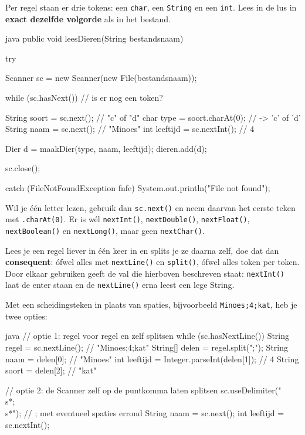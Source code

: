 \documentclass[a4paper,11pt]{article}
\begin{document}
Per regel staan er drie tokens: een \texttt{char}, een \texttt{String} en een
\texttt{int}. Lees in de lus in \textbf{exact dezelfde volgorde} als in het
bestand.

\begin{codeblock}{java}
    public void leesDieren(String bestandsnaam)
    {
    try {
    Scanner sc = new Scanner(new File(bestandsnaam));

    while (sc.hasNext())    // is er nog een token?
    {
    String soort = sc.next();        // "c"  of "d"
    char type = soort.charAt(0);     // -> 'c' of 'd'
    String naam = sc.next();         // "Minoes"
    int leeftijd = sc.nextInt();     // 4

    Dier d = maakDier(type, naam, leeftijd);
    dieren.add(d);
    }
    sc.close();
    }
    catch (FileNotFoundException fnfe) {
            System.out.println("File not found");
        }
    }
\end{codeblock}

\begin{warningbox}
    Wil je \'e\'en letter lezen, gebruik dan \texttt{sc.next()} en neem daarvan het
    eerste teken met \texttt{.charAt(0)}. Er is w\'el \texttt{nextInt()},
    \texttt{nextDouble()}, \texttt{nextFloat()}, \texttt{nextBoolean()} en
    \texttt{nextLong()}, maar geen \texttt{nextChar()}.
\end{warningbox}

\begin{warningbox}
    Lees je een regel liever in \'e\'en keer in en splits je ze daarna zelf, doe dat
    dan \textbf{consequent}: \'ofwel alles met \texttt{nextLine()} en
    \texttt{split()}, \'ofwel alles token per token. Door elkaar gebruiken geeft de
    val die hierboven beschreven staat: \texttt{nextInt()} laat de enter staan en de
    \texttt{nextLine()} erna leest een lege String.
\end{warningbox}

Met een scheidingsteken in plaats van spaties, bijvoorbeeld
\texttt{Minoes;4;kat}, heb je twee opties:

\begin{codeblock}{java}
    // optie 1: regel voor regel en zelf splitsen
    while (sc.hasNextLine()) {
            String regel = sc.nextLine();          // "Minoes;4;kat"
            String[] delen = regel.split(";");
            String naam = delen[0];                // "Minoes"
            int leeftijd = Integer.parseInt(delen[1]);  // 4
            String soort = delen[2];               // "kat"
        }

    // optie 2: de Scanner zelf op de puntkomma laten splitsen
    sc.useDelimiter("\\s*;\\s*");   // ; met eventueel spaties errond
    String naam = sc.next();
    int leeftijd = sc.nextInt();
\end{codeblock}
\end{document}
